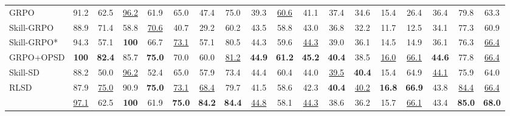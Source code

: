 \begin{table}[t]
{\begin{tabular}{l CCCCCCC CCCCCCCC CC }
    GRPO
        & 91.2 & 62.5 & \underline{96.2} & 61.9 & 65.0 & 47.4 & 75.0
        & 39.3 & \underline{60.6} & 41.1 & 37.4 & 34.6 & 15.4 & 26.4 & 36.4
        & 79.8 & 63.3
        \\
    Skill-GRPO
        & 88.9 & 71.4 & 58.8 & \underline{70.6} & 40.7 & 29.2 & 60.2
        & 43.5 & 58.8 & 43.0 & 36.8 & 32.2 & 11.7 & 12.5 & 34.1
        & 77.3 & 60.9
        \\
    Skill-GRPO*
        & 94.3 & 57.1 & \textbf{100} & 66.7 & \underline{73.1} & 57.1 & 80.5
        & 44.3 & 59.6 & \underline{44.3} & 39.0 & 36.1 & 14.5 & 14.9 & 36.1
        & 76.3 & \underline{66.4}
        \\
    GRPO+OPSD
        & \textbf{100} & \textbf{82.4} & 85.7 & \textbf{75.0} & 70.0 & 60.0 & \underline{81.2}
        & \textbf{44.9} & \textbf{61.2} & \textbf{45.2} & \textbf{40.4} & 38.5 & \underline{16.0} & \underline{66.1} & \textbf{44.6}
        & 77.8 & \underline{66.4}
        \\
    Skill-SD
        & 88.2 & 50.0 & \underline{96.2} & 52.4 & 65.0 & 57.9 & 73.4
        & 44.4 & 60.4 & 44.0 & \underline{39.5} & \textbf{40.4} & 15.4 & 64.9 & \underline{44.1}
        & 75.9 & 64.0
        \\
    RLSD
        & 87.9 & \underline{75.0} & 90.9 & \textbf{75.0} & \underline{73.1} & \underline{68.4} & 79.7
        & 41.5 & 58.6 & 42.3 & \textbf{40.4} & \underline{40.2} & \textbf{16.8} & \textbf{66.9} & 43.8
        & \underline{84.4} & \underline{66.4}
        \\
    \textbf{\methodname{}}
        & \underline{97.1} & 62.5 & \textbf{100} & 61.9 & \textbf{75.0} & \textbf{84.2} & \textbf{84.4}
        & \underline{44.8} & 58.1 & \underline{44.3} & 38.6 & 36.2 & 15.7 & \underline{66.1} & 43.4
        & \textbf{85.0} & \textbf{68.0}
        \\


\end{tabular}}
\end{table}
